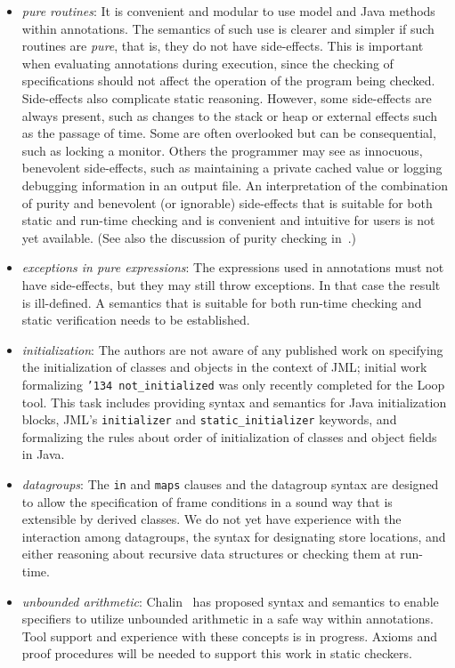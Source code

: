 \documentclass{llncs}
\begin{document}
\begin{itemize}
\setlength{\partopsep}{0in}\setlength{\parskip}{0in}\setlength{\itemsep}{0in}\setlength{\topsep}{0in}
\item \textit{pure routines}: It is convenient and modular to use
  model and Java methods within annotations.  The semantics of such
  use is clearer and simpler if such routines are {\em pure}, that is,
  they do not have side-effects.  This is important when evaluating
  annotations during execution, since the checking of specifications
  should not affect the operation of the program being checked.
  Side-effects also complicate static reasoning.  However, some
  side-effects are always present, such as changes to the stack or
  heap or external effects such as the passage of time.  Some are
  often overlooked but can be consequential, such as locking a
  monitor.  Others the programmer may see as innocuous, benevolent
  side-effects, such as maintaining a private cached value or logging
  debugging information in an output file.  An interpretation of the
  combination of purity and benevolent (or ignorable) side-effects
  that is suitable for both static and run-time checking and is
  convenient and intuitive for users is not yet available. (See also
  the discussion of purity checking in~\cite{Leavens-etal03a}.)
\item \textit{exceptions in pure expressions}: The expressions used in
  annotations must not have side-effects, but they may still throw
  exceptions.  In that case the result is ill-defined.  A semantics
  that is suitable for both run-time checking and static verification
  needs to be established.
\item \textit{initialization}: The authors are not aware of any
  published work on specifying the initialization of classes and
  objects in the context of JML; initial work formalizing
  \texttt{\char'134 not\_initialized} was only recently completed for
  the Loop tool.  This task includes providing syntax and semantics
  for Java initialization blocks, JML's \texttt{initializer} and
  \texttt{static\_initializer} keywords, and formalizing the rules
  about order of initialization of classes and object fields in Java.
\item \textit{datagroups}: The \texttt{in} and \texttt{maps} clauses
  and the datagroup syntax are designed to allow the specification of
  frame conditions in a sound way that is extensible by derived
  classes.  We do not yet have experience with the interaction among
  datagroups, the syntax for designating store locations, and either
  reasoning about recursive data structures or checking them at
  run-time.
\item \textit{unbounded arithmetic}: Chalin~\cite{Chalin03} has
  proposed syntax and semantics to enable specifiers to utilize
  unbounded arithmetic in a safe way within annotations.  Tool support
  and experience with these concepts is in progress.  Axioms and proof
  procedures will be needed to support this work in static checkers.
\end{itemize}
\end{document}

